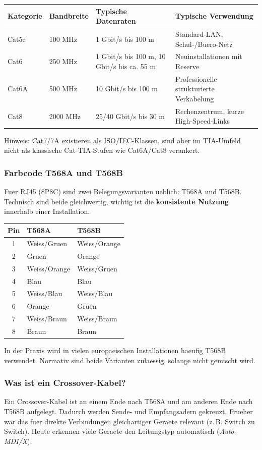 \documentclass[11pt, oneside, numbers=noenddot]{scrbook}
\begin{document}
\begin{longtable}{|l|l|l|l|}
\hline
\textbf{Kategorie} & \textbf{Bandbreite} & \textbf{Typische Datenraten} & \textbf{Typische Verwendung} \\
\hline
Cat5e & 100 MHz & 1 Gbit/s bis 100 m & Standard-LAN, Schul-/Buero-Netz \\
\hline
Cat6 & 250 MHz & 1 Gbit/s bis 100 m, 10 Gbit/s bis ca. 55 m & Neuinstallationen mit Reserve \\
\hline
Cat6A & 500 MHz & 10 Gbit/s bis 100 m & Professionelle strukturierte Verkabelung \\
\hline
Cat8 & 2000 MHz & 25/40 Gbit/s bis 30 m & Rechenzentrum, kurze High-Speed-Links \\
\hline
\end{longtable}

Hinweis: Cat7/7A existieren als ISO/IEC-Klassen, sind aber im TIA-Umfeld nicht als klassische Cat-TIA-Stufen wie Cat6A/Cat8 verankert.

\subsubsection{Farbcode T568A und T568B}
Fuer RJ45 (8P8C) sind zwei Belegungsvarianten ueblich: T568A und T568B. Technisch sind beide gleichwertig, wichtig ist die \textbf{konsistente Nutzung} innerhalb einer Installation.

\begin{longtable}{|c|l|l|}
\hline
\textbf{Pin} & \textbf{T568A} & \textbf{T568B} \\
\hline
1 & Weiss/Gruen & Weiss/Orange \\
\hline
2 & Gruen & Orange \\
\hline
3 & Weiss/Orange & Weiss/Gruen \\
\hline
4 & Blau & Blau \\
\hline
5 & Weiss/Blau & Weiss/Blau \\
\hline
6 & Orange & Gruen \\
\hline
7 & Weiss/Braun & Weiss/Braun \\
\hline
8 & Braun & Braun \\
\hline
\end{longtable}

In der Praxis wird in vielen europaeischen Installationen haeufig T568B verwendet. Normativ sind beide Varianten zulaessig, solange nicht gemischt wird.

\subsubsection{Was ist ein Crossover-Kabel?}
Ein Crossover-Kabel ist an einem Ende nach T568A und am anderen Ende nach T568B aufgelegt. Dadurch werden Sende- und Empfangsadern gekreuzt. Frueher war das fuer direkte Verbindungen gleichartiger Geraete relevant (z.\,B. Switch zu Switch). Heute erkennen viele Geraete den Leitungstyp automatisch (\textit{Auto-MDI/X}).
\end{document}
